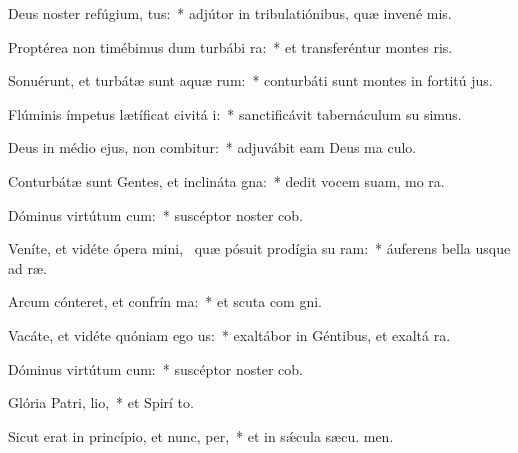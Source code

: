\item Deus noster refúgium,  tus:~* adjútor in tribulatiónibus, quæ invené  mis.
\item Proptérea non timébimus dum turbábi ra:~* et transferéntur montes   ris.
\item Sonuérunt, et turbátæ sunt aquæ rum:~* conturbáti sunt montes in fortitú jus.
\item Flúminis ímpetus lætíficat civitá i:~* sanctificávit tabernáculum su simus.
\item Deus in médio ejus, non combitur:~* adjuvábit eam Deus ma culo.
\item Conturbátæ sunt Gentes, et inclináta  gna:~* dedit vocem suam, mo  ra.
\item Dóminus virtútum cum:~* suscéptor noster  cob.
\item Veníte, et vidéte ópera mini,~\pscross{} quæ pósuit prodígia su ram:~* áuferens bella usque ad  ræ.
\item Arcum cónteret, et confrín ma:~* et scuta com gni.
\item Vacáte, et vidéte quóniam ego  us:~* exaltábor in Géntibus, et exaltá  ra.
\item Dóminus virtútum cum:~* suscéptor noster  cob.
\item Glória Patri,  lio,~* et Spirí to.
\item Sicut erat in princípio, et nunc,  per,~* et in sǽcula sæcu. men.
